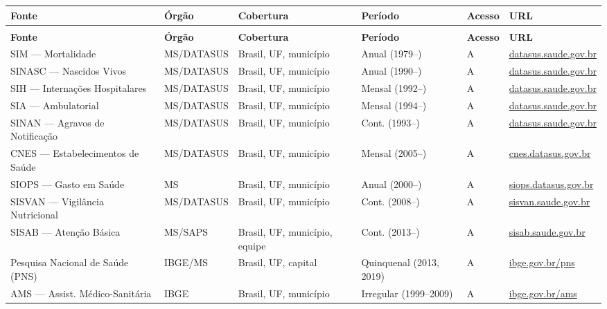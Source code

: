 {\setlength{\tabcolsep}{3pt}\footnotesize\begin{longtable}{@{} >{\raggedright\arraybackslash}p{2.9cm} >{\raggedright\arraybackslash}p{2.3cm} >{\raggedright\arraybackslash}p{2.4cm} >{\raggedright\arraybackslash}p{2.4cm} >{\raggedright\arraybackslash}p{1.1cm} >{\raggedright\arraybackslash}p{3.2cm} @{}}
\toprule
\textbf{Fonte} & \textbf{Órgão} & \textbf{Cobertura} & \textbf{Período} & \textbf{Acesso} & \textbf{URL} \\
\midrule
\endfirsthead
\multicolumn{6}{l}{\small\textit{(continuação)}} \\
\toprule
\textbf{Fonte} & \textbf{Órgão} & \textbf{Cobertura} & \textbf{Período} & \textbf{Acesso} & \textbf{URL} \\
\midrule
\endhead
\bottomrule
\endfoot

SIM --- Mortalidade
  & MS/DATASUS
  & Brasil, UF, município
  & Anual (1979--)
  & A
  & \url{datasus.saude.gov.br} \\

SINASC --- Nascidos Vivos
  & MS/DATASUS
  & Brasil, UF, município
  & Anual (1990--)
  & A
  & \url{datasus.saude.gov.br} \\

SIH --- Internações Hospitalares
  & MS/DATASUS
  & Brasil, UF, município
  & Mensal (1992--)
  & A
  & \url{datasus.saude.gov.br} \\

SIA --- Ambulatorial
  & MS/DATASUS
  & Brasil, UF, município
  & Mensal (1994--)
  & A
  & \url{datasus.saude.gov.br} \\

SINAN --- Agravos de Notificação
  & MS/DATASUS
  & Brasil, UF, município
  & Cont. (1993--)
  & A
  & \url{datasus.saude.gov.br} \\

CNES --- Estabelecimentos de Saúde
  & MS/DATASUS
  & Brasil, UF, município
  & Mensal (2005--)
  & A
  & \url{cnes.datasus.gov.br} \\

SIOPS --- Gasto em Saúde
  & MS
  & Brasil, UF, município
  & Anual (2000--)
  & A
  & \url{siops.datasus.gov.br} \\

SISVAN --- Vigilância Nutricional
  & MS/DATASUS
  & Brasil, UF, município
  & Cont. (2008--)
  & A
  & \url{sisvan.saude.gov.br} \\

SISAB --- Atenção Básica
  & MS/SAPS
  & Brasil, UF, município, equipe
  & Cont. (2013--)
  & A
  & \url{sisab.saude.gov.br} \\

Pesquisa Nacional de Saúde (PNS)
  & IBGE/MS
  & Brasil, UF, capital
  & Quinquenal (2013, 2019)
  & A
  & \url{ibge.gov.br/pns} \\

AMS --- Assist. Médico-Sanitária
  & IBGE
  & Brasil, UF, município
  & Irregular (1999--2009)
  & A
  & \url{ibge.gov.br/ams} \\

\end{longtable}}

